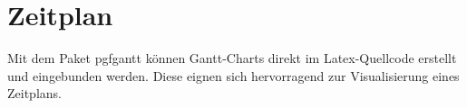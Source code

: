 \section*{Zeitplan}

Mit dem Paket pgfgantt können Gantt-Charts direkt im Latex-Quellcode erstellt und eingebunden werden. Diese eignen sich hervorragend zur Visualisierung eines Zeitplans.

\begin{center}
        
\end{center}


\printbibliography


